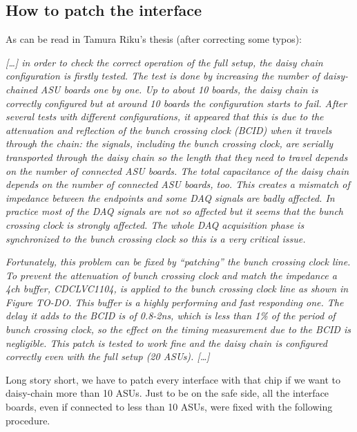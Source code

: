 \subsection{How to patch the interface}\label{sec:how-patch-interface}
As can be read in Tamura Riku's thesis (after correcting some typos):

\textit{[\dots] in order to check the correct operation of the full setup, the
  daisy chain configuration is firstly tested. The test is done by increasing
  the number of daisy-chained ASU boards one by one. Up to about 10 boards, the
  daisy chain is correctly configured but at around 10 boards the configuration
  starts to fail. After several tests with different configurations, it appeared
  that this is due to the attenuation and reflection of the bunch crossing clock
  (BCID) when it travels through the chain: the signals, including the bunch
  crossing clock, are serially transported through the daisy chain so the length
  that they need to travel depends on the number of connected ASU boards. The
  total capacitance of the daisy chain depends on the number of connected ASU
  boards, too. This creates a mismatch of impedance between the endpoints and
  some DAQ signals are badly affected. In practice most of the DAQ signals are
  not so affected but it seems that the bunch crossing clock is strongly
  affected. The whole DAQ acquisition phase is synchronized to the bunch
  crossing clock so this is a very critical issue.}

\textit{Fortunately, this problem can be fixed by ``patching'' the bunch
  crossing clock line. To prevent the attenuation of bunch crossing clock and
  match the impedance a 4ch buffer,
  CDCLVC1104\cite{Texas-Instruments:CDCLVC11xx}, is applied to the bunch
  crossing clock line as shown in Figure TO-DO. This buffer is a highly
  performing and fast responding one. The delay it adds to the BCID is of
  0.8-2ns, which is less than 1\% of the period of bunch crossing clock, so the
  effect on the timing measurement due to the BCID is negligible. This patch is
  tested to work fine and the daisy chain is configured correctly even with the
  full setup (20 ASUs). [\dots]}

Long story short, we have to patch every interface with that chip if we want to
daisy-chain more than 10 ASUs. Just to be on the safe side, all the interface
boards, even if connected to less than 10 ASUs, were fixed with the following
procedure.

